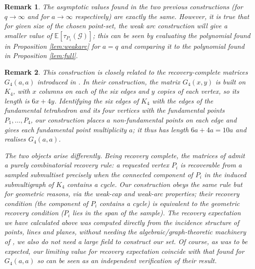\documentclass{article}
\newtheorem{remark}{Remark}
\newcommand{\Gscr}{\mathscr{G}}
\newcommand{\E}{\mathbb{E}}
\begin{document}
  \begin{remark}
      The asymptotic values found in the two previous constructions (for $q\to \infty$ and for $a\to \infty $ respectively) are exactly the same. However, it is true that for given size of the chosen point-set, the weak arc construction will give a smaller value of $\E[\tau_{P_1}(\Gscr)]$; this can be seen by evaluating the polynomial found in Proposition \ref{lem:weakarc} for $a=q$ and comparing it to the polynomial found in Proposition \ref{lem:full}.
  \end{remark}

  \begin{remark} 
This construction is closely related to the recovery-complete matrices
 $G_4(a,a)$ introduced in \cite{BoruchovskyEtAl2026}.  In their construction, the matrix $G_4(x,y)$ is built on $K_4$, with $x$ columns on each of the six edges
and $y$ copies of each vertex, so its length is $6x+4y$. Identifying the
six edges of $K_4$ with the edges of the fundamental tetrahedron and its
four vertices with the fundamental points $P_1,\dots,P_4$, our
construction places $a$ non-fundamental points on each edge and gives
each fundamental point multiplicity $a$; it thus has length $6a+4a=10a$ and realises $G_4(a,a)$.

The two objects arise differently. Being \emph{recovery complete}, the
matrices of \cite{BoruchovskyEtAl2026} admit a purely combinatorial recovery rule: a requested vertex $P_i$ is recoverable from a sampled
submultiset precisely when the connected component of $P_i$ in the
induced submultigraph of $K_4$ contains a cycle. Our construction obeys the same rule but for geometric reasons, via the weak-cap and weak-arc properties; their recovery condition (the component of $P_i$ contains a cycle) is equivalent to the geometric recovery condition ($P_i$ lies in the span of the sample).
The recovery expectation we have calculated above was computed directly from the incidence structure of points, lines and planes, without needing the algebraic/graph-theoretic  machinery of
\cite{BoruchovskyEtAl2026}, we also do not need a large field to construct our set. Of course, as was to be expected, our limiting value for recovery expectation coincide with that found for $G_4(a,a)$ so can be seen as an independent verification of their result.


  


\end{remark}
\end{document}
